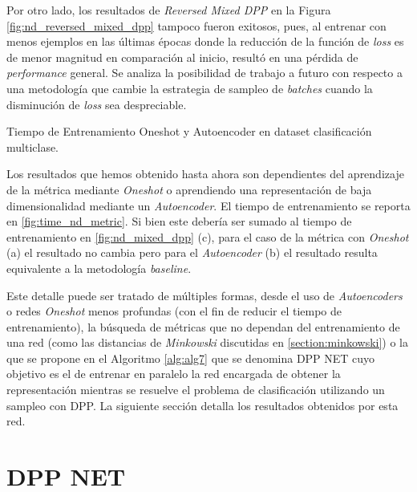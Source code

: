 Por otro lado, los resultados de \textit{Reversed Mixed DPP} en la Figura \ref{fig:nd_reversed_mixed_dpp} tampoco fueron exitosos, pues, al entrenar con menos ejemplos en las últimas épocas donde la reducción de la función de \textit{loss} es de menor magnitud en comparación al inicio, resultó en una pérdida de \textit{performance} general. Se analiza la posibilidad de trabajo a futuro con respecto a una metodología que cambie la estrategia de sampleo de \textit{batches} cuando la disminución de \textit{loss} sea despreciable. 

\begin{images}[\label{fig:time_nd_metric}]{\centering Tiempo de Entrenamiento Oneshot y Autoencoder en dataset clasificación multiclase.}
\end{images}


Los resultados que hemos obtenido hasta ahora son dependientes del aprendizaje de la métrica mediante \textit{Oneshot} o aprendiendo una representación de baja dimensionalidad mediante un \textit{Autoencoder}. El tiempo de entrenamiento se reporta en \ref{fig:time_nd_metric}. Si bien este debería ser sumado al tiempo de entrenamiento en \ref{fig:nd_mixed_dpp} (c), para el caso de la métrica con \textit{Oneshot} (a) el resultado no cambia pero para el \textit{Autoencoder} (b) el resultado resulta equivalente a la metodología \textit{baseline}.

\vspace{0.2cm}

Este detalle puede ser tratado de múltiples formas, desde el uso de \textit{Autoencoders} o redes \textit{Oneshot} menos profundas (con el fin de reducir el tiempo de entrenamiento), la búsqueda de métricas que no dependan del entrenamiento de una red (como las distancias de \textit{Minkowski} discutidas en \ref{section:minkowski}) o la que se propone en el Algoritmo \ref{alg:alg7} que se denomina DPP NET cuyo objetivo es el de entrenar en paralelo la red encargada de obtener la representación mientras se resuelve el problema de clasificación utilizando un sampleo con DPP. La siguiente sección detalla los resultados obtenidos por esta red. 


\section{DPP NET}

